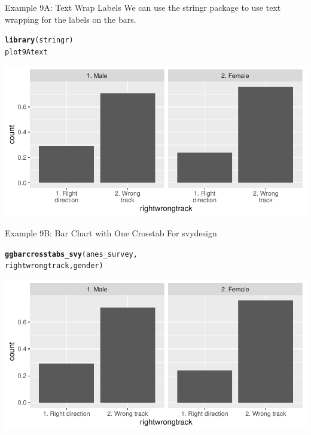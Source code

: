 \documentclass{beamer}\usepackage[]{graphicx}\usepackage[]{xcolor}
\makeatletter
\newcommand{\hlstd}[1]{\textcolor[rgb]{0.345,0.345,0.345}{#1}}%
\newcommand{\hlkwd}[1]{\textcolor[rgb]{0.737,0.353,0.396}{\textbf{#1}}}%
\newenvironment{kframe}{%
 \def\at@end@of@kframe{}%
 \ifinner\ifhmode%
  \def\at@end@of@kframe{\end{minipage}}%
  \begin{minipage}{\columnwidth}%
 \fi\fi%
 \def\FrameCommand##1{\hskip\@totalleftmargin \hskip-\fboxsep
 \colorbox{shadecolor}{##1}\hskip-\fboxsep
     \hskip-\linewidth \hskip-\@totalleftmargin \hskip\columnwidth}%
 \MakeFramed {\advance\hsize-\width
   \@totalleftmargin\z@ \linewidth\hsize
   \@setminipage}}%
 {\par\unskip\endMakeFramed%
 \at@end@of@kframe}
\newenvironment{knitrout}{}{} %
\makeatother
\begin{document}
\begin{frame}[fragile]{Example 9A: Text Wrap Labels}
We can use the stringr package to use text wrapping for the labels on the bars.
\begin{knitrout}
\color{fgcolor}\begin{kframe}
\begin{alltt}
\hlkwd{library}\hlstd{(stringr)}
\hlstd{plot9Atext}
\end{alltt}
\end{kframe}
\includegraphics[width=0.95\linewidth]{figure/unnamed-chunk-54-1} 
\end{knitrout}
\end{frame}

\begin{frame}[fragile]{Example 9B: Bar Chart with One Crosstab For svydesign}

\begin{knitrout}
\color{fgcolor}\begin{kframe}
\begin{alltt}
\hlkwd{ggbarcrosstabs_svy}\hlstd{(anes_survey,}
    \hlstd{rightwrongtrack, gender)}
\end{alltt}
\end{kframe}
\includegraphics[width=0.95\linewidth]{figure/unnamed-chunk-55-1} 
\end{knitrout}
\end{frame}
\end{document}
